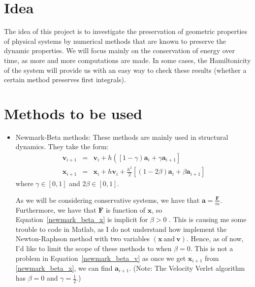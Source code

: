 \documentclass[a4paper, 11pt]{article}
\renewcommand{\vec}[1]{\mathbf{#1}}
\begin{document}
	\section{Idea}
The idea of this project is to investigate the preservation of geometric properties of physical systems by numerical methods that are known to preserve the dynamic properties. We will focus mainly on the conservation of energy over time, as more and more computations are made. In some cases, the Hamiltonicity of the system will provide us with an easy way to check these results (whether a certain method preserves first integrals).

	\section{Methods to be used}
\begin{itemize}
	\item Newmark-Beta methods: \newline
These methods are mainly used in structural dynamics. They take the form:
\begin{eqnarray}
	\vec{v}_{i+1} & = & \vec{v}_{i} + h\left( \left[1-\gamma \right)\vec{a}_{i} + \gamma \vec{a}_{i+1}\right] \label{newmark_beta_v}\\
	\vec{x}_{i+1} & = & \vec{x}_{i} + h\vec{v}_{i} + \frac{h^2}{2}\left[ \left(1-2\beta \right)\vec{a}_{i} + \beta \vec{a}_{i+1}\right] \label{newmark_beta_x}
\end{eqnarray} where $\gamma \in \left[0, 1 \right]$ and $2\beta \in \left[0, 1 \right]$.

As we will be considering conservative systems, we have that $ \vec{a}  = \frac{\vec{F}}{m} $. Furthermore, we have that $\vec{F}$ is function of $\vec{x}$, so Equation~\ref{newmark_beta_x} is implicit for $ \beta > 0 $ . This is causing me some trouble to code in Matlab, as I do not understand how implement the Newton-Raphson method with two variables $\left(\vec{x} ~\mbox{and}~ \vec{v}\right)$. Hence, as of now, I'd like to limit the scope of these methods to when $\beta = 0$. This is not a problem in Equation~\ref{newmark_beta_v} as once we get $\vec{x}_{i+1}$ from \ref{newmark_beta_x}, we can find $\vec{a}_{i+1}$. (Note: The Velocity Verlet \cite{Verlet1967} algorithm has $\beta = 0$ and $\gamma = \frac{1}{2} $.) 
\end{itemize}
\end{document}

